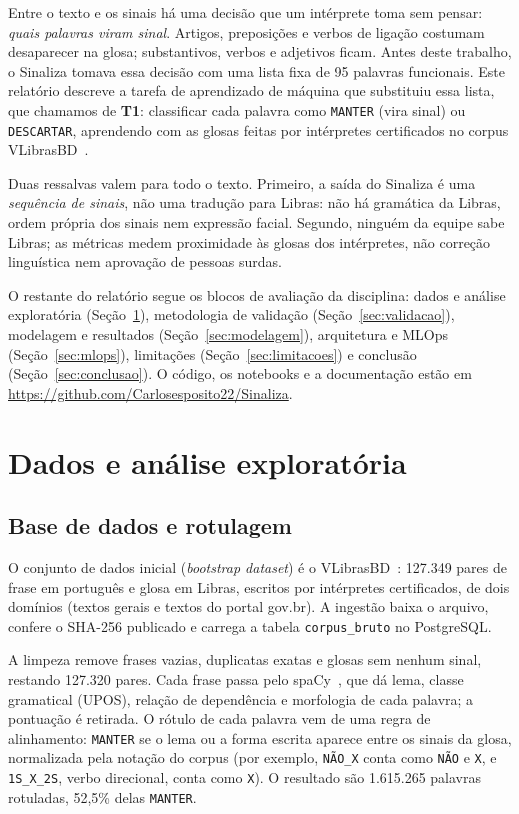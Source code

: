 \documentclass[12pt]{article}
\begin{document}
Entre o texto e os sinais há uma decisão que um intérprete toma sem pensar: \emph{quais palavras viram
sinal}. Artigos, preposições e verbos de ligação costumam desaparecer na glosa; substantivos, verbos e
adjetivos ficam. Antes deste trabalho, o Sinaliza tomava essa decisão com uma lista fixa de 95 palavras
funcionais. Este relatório descreve a tarefa de aprendizado de máquina que substituiu essa lista, que
chamamos de \textbf{T1}: classificar cada palavra como \texttt{MANTER} (vira sinal) ou
\texttt{DESCARTAR}, aprendendo com as glosas feitas por intérpretes certificados no corpus
VLibrasBD~\cite{lima:25}.

Duas ressalvas valem para todo o texto. Primeiro, a saída do Sinaliza é uma \emph{sequência de sinais},
não uma tradução para Libras: não há gramática da Libras, ordem própria dos sinais nem expressão facial.
Segundo, ninguém da equipe sabe Libras; as métricas medem proximidade às glosas dos intérpretes, não
correção linguística nem aprovação de pessoas surdas.

O restante do relatório segue os blocos de avaliação da disciplina: dados e análise exploratória
(Seção~\ref{sec:dados}), metodologia de validação (Seção~\ref{sec:validacao}), modelagem e resultados
(Seção~\ref{sec:modelagem}), arquitetura e MLOps (Seção~\ref{sec:mlops}), limitações
(Seção~\ref{sec:limitacoes}) e conclusão (Seção~\ref{sec:conclusao}). O código, os notebooks e a
documentação estão em \url{https://github.com/Carlosesposito22/Sinaliza}.

\section{Dados e análise exploratória}\label{sec:dados}

\subsection{Base de dados e rotulagem}

O conjunto de dados inicial (\emph{bootstrap dataset}) é o VLibrasBD~\cite{lima:25}: 127.349 pares
de frase em português e glosa em Libras, escritos por intérpretes certificados, de dois domínios
(textos gerais e textos do portal gov.br). A ingestão baixa o arquivo, confere o SHA-256 publicado e
carrega a tabela \texttt{corpus\_bruto} no PostgreSQL.

A limpeza remove frases vazias, duplicatas exatas e glosas sem nenhum sinal, restando 127.320 pares.
Cada frase passa pelo spaCy~\cite{honnibal:20}, que dá lema, classe gramatical (UPOS), relação de
dependência e morfologia de cada palavra; a pontuação é retirada. O rótulo de cada palavra vem de uma
regra de alinhamento: \texttt{MANTER} se o lema ou a forma escrita aparece entre os sinais da glosa,
normalizada pela notação do corpus (por exemplo, \texttt{NÃO\_X} conta como \texttt{NÃO} e
\texttt{X}, e \texttt{1S\_X\_2S}, verbo direcional, conta como \texttt{X}). O resultado são
1.615.265 palavras rotuladas, 52,5\% delas \texttt{MANTER}.
\end{document}

